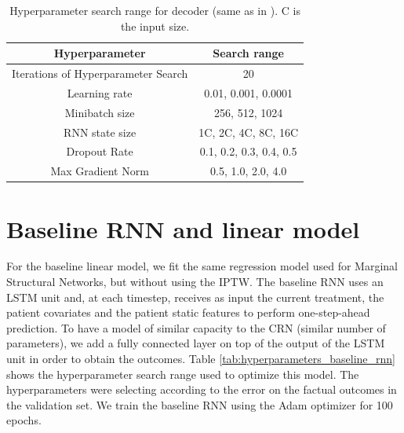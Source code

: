 \documentclass{article} %
\begin{document}
	 	\begin{table}[ht]
	 	\caption{Hyperparameter search range for decoder (same as in \cite{lim2018forecasting}). C is the input size. }
	 	\label{tab:hyperparameters_rmsn_decoder}
	 	\vskip 0.15in
	 	\begin{center}
	 		\begin{small}
	 			\begin{tabular}{cc}
	 				\toprule
	 				Hyperparameter & Search range \\
	 				\hline
	 				\hline
	 				Iterations of Hyperparameter Search & 20 \\
	 				Learning rate &    0.01, 0.001, 0.0001  \\
	 				Minibatch size &  256, 512, 1024  \\
	 				RNN state size &   1C, 2C, 4C, 8C, 16C   \\
	 				Dropout Rate &  0.1, 0.2, 0.3, 0.4, 0.5 \\
	 				Max Gradient Norm & 0.5, 1.0, 2.0, 4.0 \\
	 				\bottomrule
	 			\end{tabular}
	 		\end{small}
	 	\end{center}
	 	\vskip -0.1in
	 \end{table}
	
	
	\section{Baseline RNN and linear model} \label{apx:baseline_RNN}
	
	For the baseline linear model, we fit the same regression model used for Marginal Structural Networks, but without using the IPTW. The baseline RNN uses an LSTM unit and, at each timestep, receives as input the current treatment, the patient covariates and the patient static features to perform one-step-ahead prediction. To have a model of similar capacity to the CRN (similar number of parameters), we add a fully connected layer on top of the output of the LSTM unit in order to obtain the outcomes. Table \ref{tab:hyperparameters_baseline_rnn} shows the hyperparameter search range used to optimize this model.
	The hyperparameters were selecting according to the error on the factual outcomes in the validation set. We train the baseline RNN using the Adam optimizer for 100 epochs. 
	
\end{document}
